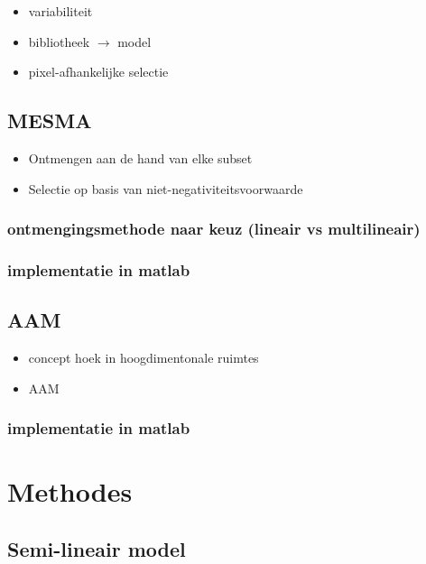 \documentclass[12pt]{report}
\begin{document}
\begin{itemize}
\item variabiliteit
\item bibliotheek $\rightarrow$ model
\item pixel-afhankelijke selectie
\end{itemize}

\section{MESMA}

\begin{itemize}
\item Ontmengen aan de hand van elke subset
\item Selectie op basis van niet-negativiteitsvoorwaarde
\end{itemize}

\subsection{ontmengingsmethode naar keuz (lineair vs multilineair)}

\subsection{implementatie in matlab}

\section{AAM}

\begin{itemize}
\item concept hoek in hoogdimentonale ruimtes
\item AAM
\end{itemize}

\subsection{implementatie in matlab}


\chapter{Methodes}

\section{Semi-lineair model}
\end{document}

